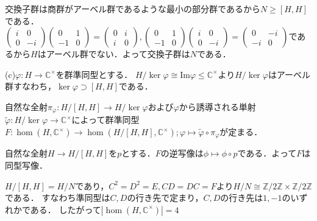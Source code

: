 \documentclass[
		book,
		head_space=20mm,
		foot_space=20mm,
		gutter=10mm,
		line_length=190mm
]{jlreq}
\begin{document}
交換子群は商群がアーベル群であるような最小の部分群であるから$N \ge [H,H]$である．
$\begin{pmatrix}
	i & 0 \\
	0 & -i
\end{pmatrix}
\begin{pmatrix}
	0 & 1 \\
	-1 & 0
\end{pmatrix}= \begin{pmatrix}
	0 & i \\
	i & 0
	\end{pmatrix},\begin{pmatrix}
	0 & 1 \\
	-1 & 0
	\end{pmatrix}
\begin{pmatrix}
	i & 0 \\
	0 & -i
\end{pmatrix}=\begin{pmatrix}
	0 & -i \\
	-i & 0
	\end{pmatrix}$であるから$H$はアーベル群でない．よって交換子群は$N$である．

(c)$\varphi\colon H\rightarrow \mathbb{C}^{\times}$を群準同型とする．
$H/\ker \varphi \cong \mathrm{Im}\varphi\le \mathbb{C}^{\times}$より$H/\ker \varphi$はアーベル群すなわち，$\ker \varphi\supset [H,H]$である．

自然な全射$\pi_{\varphi}\colon H/[H,H]\rightarrow H/\ker \varphi$および$\varphi$から誘導される単射$\tilde{\varphi}\colon H/\ker \varphi \rightarrow \mathbb{C}^{\times}$によって群準同型
$F\colon \hom(H,\mathbb{C}^{\times})\rightarrow \hom(H/[H,H],\mathbb{C}^{\times});\varphi\mapsto \tilde{\varphi}\circ\pi_{\varphi}$が定まる．

自然な全射$ H \rightarrow H/[H,H]$を$p$とする．$F$の逆写像は$\phi\mapsto \phi\circ p$である．よって$F$は同型写像．

$H/[H,H]=H/N$であり，$C^2=D^2=E,CD=DC=F$より$H/N \cong \mathbb{Z}/2\mathbb{Z}\times \mathbb{Z}/2\mathbb{Z}$である．
すなわち準同型は$C,D$の行き先で定まり，$C,D$の行き先は$1,-1$のいずれかである．
したがって$| \hom(H,\mathbb{C}^{\times})|=4$
\end{document}
